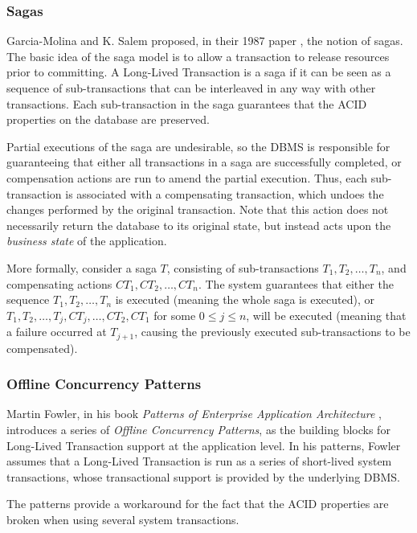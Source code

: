 \documentclass{llncs}
\begin{document}
\subsubsection{Sagas}
\label{sec:sagas}

Garcia-Molina and K. Salem proposed, in their 1987 paper
\cite{garcia1987sagas}, the notion of sagas. The basic idea of the
saga model is to allow a transaction to release resources prior to
committing. A Long-Lived Transaction is a saga if it can be seen as a
sequence of sub-transactions that can be interleaved in any way with
other transactions. Each sub-transaction in the saga guarantees that
the ACID properties on the database are preserved.

Partial executions of the saga are undesirable, so the DBMS is
responsible for guaranteeing that either all transactions in a saga
are successfully completed, or compensation actions are run to amend
the partial execution. Thus, each sub-transaction is associated with a
compensating transaction, which undoes the changes performed by the
original transaction. Note that this action does not necessarily
return the database to its original state, but instead acts upon the
{\it business state} of the application.

More formally, consider a saga $T$, consisting of sub-transactions
$T_1, T_2, \ldots, T_n$, and compensating actions $CT_1, CT_2, \ldots,
CT_n$. The system guarantees that either the sequence $T_1, T_2,
\ldots, T_n$ is executed (meaning the whole saga is executed), or
$T_1, T_2, \ldots, T_j,CT_j, \ldots, CT_2, CT_1$ for some $0 \le j \le
n$, will be executed (meaning that a failure occurred at $T_{j+1}$,
causing the previously executed sub-transactions to be compensated).

\subsubsection{Offline Concurrency Patterns}

Martin Fowler, in his book {\it Patterns of Enterprise Application
  Architecture} \cite{fowler2003patterns}, introduces a series of {\it
  Offline Concurrency Patterns}, as the building blocks for Long-Lived
Transaction support at the application level. In his patterns, Fowler
assumes that a Long-Lived Transaction is run as a series of
short-lived system transactions, whose transactional support is
provided by the underlying DBMS.

The patterns provide a workaround for the fact that the ACID
properties are broken when using several system transactions.
\end{document}
